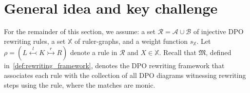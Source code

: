 \section{General idea and key challenge}
\label{subgraph_counting:sec:general_idea}
For the remainder of this section, we assume: a set \( \mathcal{R} = \mathcal{A} \cup \mathcal{B} \) of injective DPO rewriting rules, a set \( \mathbb{X} \) of ruler-graphs, and a weight function \( s_{\mathbb{X}} \).  Let \( \rho = (L \overset{l}{\leftarrowtail} K \overset{r}{\rightarrowtail} R) \) denote a rule in \( \mathcal{R} \) and \( X \in \mathbb{X} \). 
Recall that \(\mathfrak{M}\), defined in~\autoref{def:rewriting_framework}, denotes the DPO rewriting framework that associates each rule with the collection of all DPO diagrams witnessing rewriting steps using the rule, where the matches are monic.

